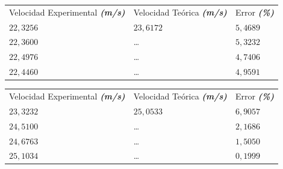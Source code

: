 \documentclass[twocolumn, 12pt]{article}
\newcommand{\bolditalic}[1]{\textbf{\textit{#1}}}
\begin{document}
\begin{table}[H]
    \begin{tabularx}{0.9\linewidth}{|>{\centering\arraybackslash}X|>{\centering\arraybackslash}X|>{\centering\arraybackslash}X|}
        \multicolumn{3}{c}{\large $M_{2}$}                                                                         \\\hline
        Velocidad Experimental \bolditalic{(m/s)} & Velocidad Teórica \bolditalic{(m/s)} & Error \bolditalic{(\%)} \\\hline
        $22,3256$                                 & $23,6172$                            & $5,4689$                \\\hline
        $22,3600$                                 & \dots                                & $5,3232$                \\\hline
        $22,4976$                                 & \dots                                & $4,7406$                \\\hline
        $22,4460$                                 & \dots                                & $4,9591$                \\\hline
    \end{tabularx}
\end{table}

\vspace{-.5cm}

\begin{table}[H]
    \begin{tabularx}{0.9\linewidth}{|>{\centering\arraybackslash}X|>{\centering\arraybackslash}X|>{\centering\arraybackslash}X|}
        \multicolumn{3}{c}{\large $M_{3}$}                                                                         \\\hline
        Velocidad Experimental \bolditalic{(m/s)} & Velocidad Teórica \bolditalic{(m/s)} & Error \bolditalic{(\%)} \\\hline
        $23,3232$                                 & $25,0533$                            & $6,9057$                \\\hline
        $24,5100$                                 & \dots                                & $2,1686$                \\\hline
        $24,6763$                                 & \dots                                & $1,5050$                \\\hline
        $25,1034$                                 & \dots                                & $0,1999$                \\\hline
    \end{tabularx}
\end{table}
\end{document}

